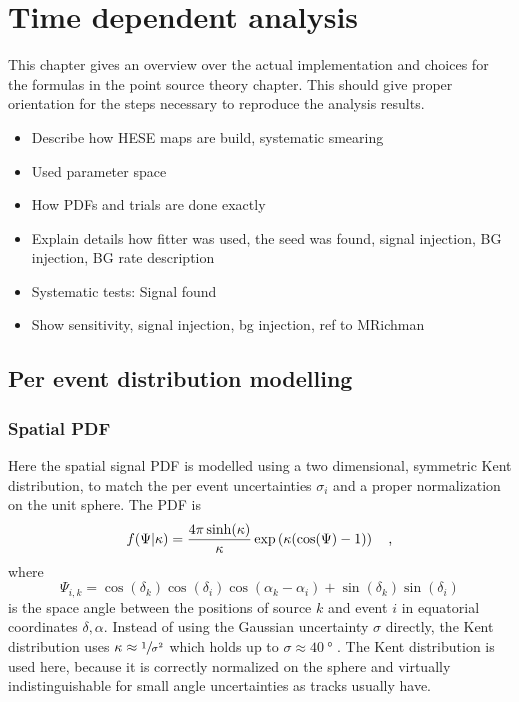 \chapter{Time dependent analysis}

This chapter gives an overview over the actual implementation and choices for the formulas in the point source theory chapter.
This should give proper orientation for the steps necessary to reproduce the analysis results.

\begin{itemize}
  \item Describe how HESE maps are build, systematic smearing
  \item Used parameter space
  \item How PDFs and trials are done exactly
  \item Explain details how fitter was used, the seed was found, signal injection, BG injection, BG rate description
  \item Systematic tests: Signal found
  \item Show sensitivity, signal injection, bg injection, ref to MRichman
\end{itemize}


\section{Per event distribution modelling}
\subsection*{Spatial PDF}
Here the spatial signal PDF is modelled using a two dimensional, symmetric Kent distribution, to match the per event uncertainties $\sigma_i$ and a proper normalization on the unit sphere.
The PDF is
\begin{equation}
  f(\Psi|\kappa)
  = \frac{4\pi \sinh(\kappa)}{\kappa}\exp\left(\kappa(\cos(\Psi)-1)\right)
  \quad\text{,}
\end{equation}
where
\begin{equation}
  \Psi_{i,k}
  = \cos(\delta_k)\cos(\delta_i)\cos(\alpha_k - \alpha_i) +
    \sin(\delta_k)\sin(\delta_i)
\end{equation}
is the space angle between the positions of source $k$ and event $i$ in equatorial coordinates $\delta, \alpha$.
Instead of using the Gaussian uncertainty $\sigma$ directly, the Kent distribution uses $\kappa \approx \sfrac{1}{\sigma^2}$ which holds up to $\sigma \approx \SI{40}{\degree}$ .
The Kent distribution is used here, because it is correctly normalized on the sphere and virtually indistinguishable for small angle uncertainties as tracks usually have.

